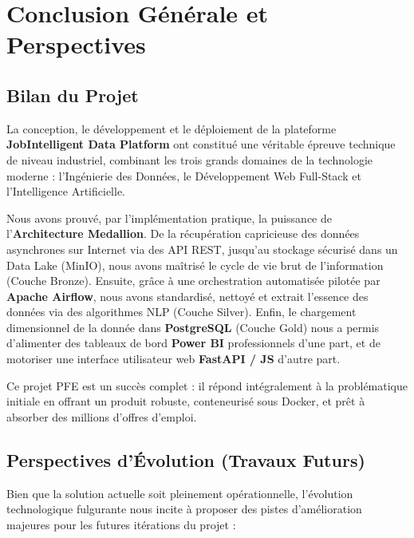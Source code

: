 \documentclass[12pt,a4paper,twoside]{report}
\begin{document}
\chapter{Conclusion Générale et Perspectives}

\section{Bilan du Projet}
La conception, le développement et le déploiement de la plateforme \textbf{JobIntelligent Data Platform} ont constitué une véritable épreuve technique de niveau industriel, combinant les trois grands domaines de la technologie moderne : l'Ingénierie des Données, le Développement Web Full-Stack et l'Intelligence Artificielle.

Nous avons prouvé, par l'implémentation pratique, la puissance de l'\textbf{Architecture Medallion}. De la récupération capricieuse des données asynchrones sur Internet via des API REST, jusqu'au stockage sécurisé dans un Data Lake (MinIO), nous avons maîtrisé le cycle de vie brut de l'information (Couche Bronze).
Ensuite, grâce à une orchestration automatisée pilotée par \textbf{Apache Airflow}, nous avons standardisé, nettoyé et extrait l'essence des données via des algorithmes NLP (Couche Silver).
Enfin, le chargement dimensionnel de la donnée dans \textbf{PostgreSQL} (Couche Gold) nous a permis d'alimenter des tableaux de bord \textbf{Power BI} professionnels d'une part, et de motoriser une interface utilisateur web \textbf{FastAPI / JS} d'autre part.

Ce projet PFE est un succès complet : il répond intégralement à la problématique initiale en offrant un produit robuste, conteneurisé sous Docker, et prêt à absorber des millions d'offres d'emploi.

\section{Perspectives d'Évolution (Travaux Futurs)}
Bien que la solution actuelle soit pleinement opérationnelle, l'évolution technologique fulgurante nous incite à proposer des pistes d'amélioration majeures pour les futures itérations du projet :
\end{document}
